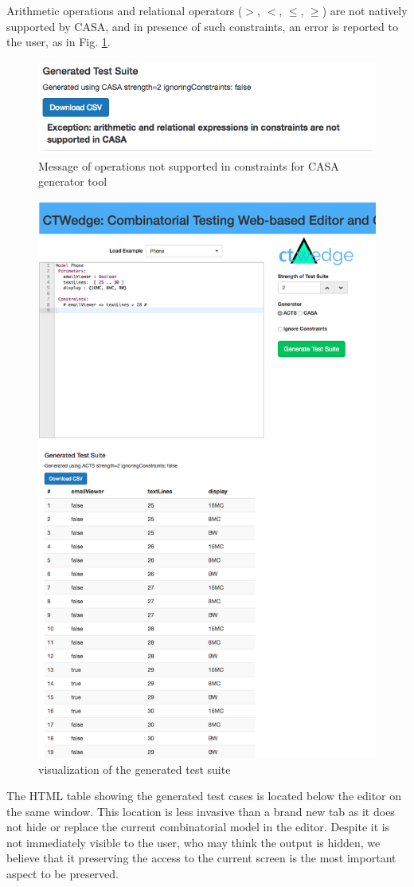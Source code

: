 \begin{tikzborder}{\cite{Gargantini16:validation}}
\begin{tikzborder}{\cite{gargantini_combinatorial_2017}}
\begin{tikzborder}{\cite{garn2019}}
\begin{tikzborder}{\cite{arcaini2019achieving}}
\begin{tikzborder}{}
Arithmetic operations and relational operators ($>$, $<$, $\le$, $\ge$) are not natively supported by CASA, and in presence of such constraints, an error is reported to the user, as in Fig. \ref{fig:casaError}.
\end{tikzborder}

\begin{figure}[hbt!]
	\centering
	\includegraphics[width=\columnwidth]{images/casaError.png}
	\caption{Message of operations not supported in constraints for CASA generator tool}\label{fig:casaError}
\end{figure}

\begin{figure}[hbt!]
	\centering
	\includegraphics[width=.5\columnwidth,trim={0 0 7cm 0},clip]{images/generatedTable.png}
	\caption{\ctwedge visualization of the generated test suite}\label{fig:generated}
\end{figure}

\begin{tikzborder}{}
The HTML table showing the generated test cases is located below the editor on the same window. This location is less invasive than a brand new tab as it does not hide or replace the current combinatorial model in the editor. Despite it is not immediately visible to the user, who may think the output is hidden, we believe that it preserving the access to the current screen is the most important aspect to be preserved.


\end{tikzborder}
\end{tikzborder}
\end{tikzborder}
\end{tikzborder}
\end{tikzborder}
